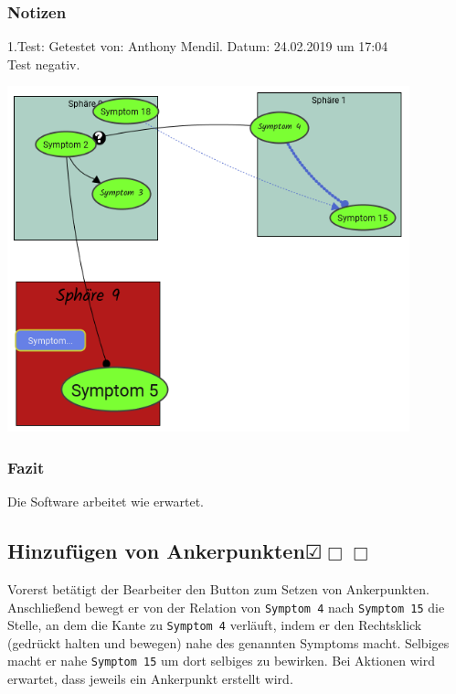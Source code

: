 \documentclass{scrartcl}
\newcommand{\subsectiont}[2]{\subsection[#1]{#1{\normalsize\normalfont #2}}}
\newcommand{\leer}{$\Box$}
\newcommand{\ok}{$\CheckedBox$}
\begin{document}
\subsubsection{Notizen}
1.Test: Getestet von: Anthony Mendil. Datum: 24.02.2019 um 17:04 \\
Test negativ. 
\begin{center}
\includegraphics[height=10cm]{3_36.PNG}
\end{center}
\subsubsection{Fazit}
Die Software arbeitet wie erwartet.

\subsectiont{Hinzufügen von Ankerpunkten}{\dotfill\ok\leer\leer}
Vorerst betätigt der Bearbeiter den Button zum Setzen von Ankerpunkten. Anschließend bewegt er von der Relation von \texttt{Symptom 4} nach \texttt{Symptom 15} die Stelle, an dem die Kante zu \texttt{Symptom 4} verläuft, indem er den Rechtsklick (gedrückt halten und bewegen) nahe des genannten Symptoms macht. Selbiges macht er nahe \texttt{Symptom 15} um dort selbiges zu bewirken. Bei Aktionen wird erwartet, dass jeweils ein Ankerpunkt erstellt wird.
\end{document}
